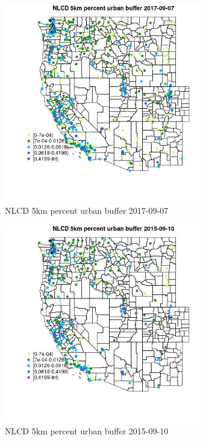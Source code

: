 \begin{figure} 
\centering  
\includegraphics[width=0.77\textwidth]{Code_Outputs/Report_ML_input_PM25_Step4_part_e_de_duplicated_aves_compiled_2019-05-21wNAs_MapObsNLCD_5km_percent_urban_buffer2017-09-07.jpg} 
\caption{\label{fig:Report_ML_input_PM25_Step4_part_e_de_duplicated_aves_compiled_2019-05-21wNAsMapObsNLCD_5km_percent_urban_buffer2017-09-07}NLCD 5km percent urban buffer 2017-09-07} 
\end{figure} 
 

\clearpage 

\begin{figure} 
\centering  
\includegraphics[width=0.77\textwidth]{Code_Outputs/Report_ML_input_PM25_Step4_part_e_de_duplicated_aves_compiled_2019-05-21wNAs_MapObsNLCD_5km_percent_urban_buffer2015-09-10.jpg} 
\caption{\label{fig:Report_ML_input_PM25_Step4_part_e_de_duplicated_aves_compiled_2019-05-21wNAsMapObsNLCD_5km_percent_urban_buffer2015-09-10}NLCD 5km percent urban buffer 2015-09-10} 
\end{figure} 
 

